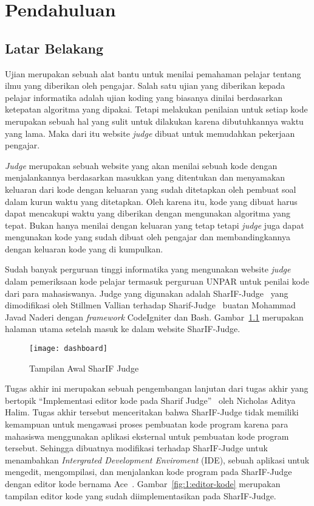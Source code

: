 \chapter{Pendahuluan}
\label{chap:intro}

\section{Latar Belakang}
\label{sec:1:latar_belakang}
Ujian merupakan sebuah alat bantu untuk menilai pemahaman pelajar tentang ilmu yang diberikan oleh pengajar. Salah satu ujian yang diberikan kepada pelajar informatika adalah ujian koding yang biasanya dinilai berdasarkan ketepatan algoritma yang dipakai. Tetapi melakukan penilaian untuk setiap kode merupakan sebuah hal yang sulit untuk dilakukan karena dibutuhkannya waktu yang lama. Maka dari itu website \textit{judge} dibuat untuk memudahkan pekerjaan pengajar.

\textit{Judge} merupakan sebuah website yang akan menilai sebuah kode dengan menjalankannya berdasarkan masukkan yang ditentukan dan menyamakan keluaran dari kode dengan keluaran yang sudah ditetapkan oleh pembuat soal dalam kurun waktu yang ditetapkan. Oleh karena itu, kode yang dibuat harus dapat mencakupi waktu yang diberikan dengan mengunakan algoritma yang tepat. Bukan hanya menilai dengan keluaran yang tetap tetapi \textit{judge} juga dapat mengunakan kode yang sudah dibuat oleh pengajar dan membandingkannya dengan keluaran kode yang di kumpulkan.

Sudah banyak perguruan tinggi informatika yang mengunakan website \textit{judge} dalam pemeriksaan kode pelajar termasuk perguruan UNPAR untuk penilai kode dari para mahasiswanya. Judge yang digunakan adalah SharIF-Judge~\cite{sharif} yang dimodifikasi oleh Stillmen Vallian terhadap Sharif-Judge~\cite{stillmen:sharif} buatan Mohammad Javad Naderi dengan \textit{framework} CodeIgniter dan Bash. Gambar~\ref{fig:1:dashboardpng} merupakan halaman utama setelah masuk ke dalam website SharIF-Judge.

\begin{figure}[H]
    \centering
    \texttt{[image: dashboard]}
    \caption[Tampilan Awal SharIF Judge]{Tampilan Awal SharIF Judge}
    \label{fig:1:dashboardpng}
\end{figure}

Tugas akhir ini merupakan sebuah pengembangan lanjutan dari tugas akhir yang bertopik ``Implementasi editor kode pada Sharif Judge''~\cite{nicholas:sharif} oleh Nicholas Aditya Halim. Tugas akhir tersebut menceritakan bahwa SharIF-Judge tidak memiliki kemampuan untuk mengawasi proses pembuatan kode program karena para mahasiswa menggunakan aplikasi eksternal untuk pembuatan kode program tersebut. Sehingga dibuatnya modifikasi terhadap SharIF-Judge untuk menambahkan \textit{Intergrated Development Enviroment} (IDE), sebuah aplikasi untuk mengedit, mengompilasi, dan menjalankan kode program pada SharIF-Judge dengan editor kode bernama Ace~\cite{ace}. Gambar~\ref{fig:1:editor-kode} merupakan tampilan editor kode yang sudah diimplementasikan pada SharIF-Judge.

